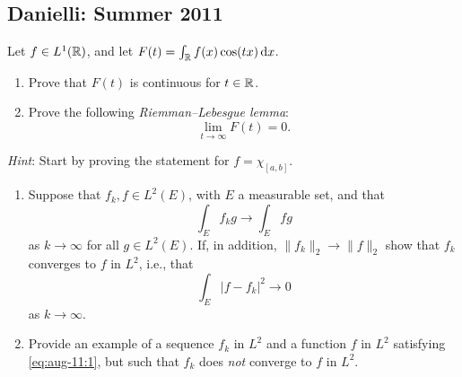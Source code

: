 \subsection{Danielli: Summer 2011}
\setcounter{exercise}{0}
\setcounter{equation}{0}

\begin{problem}
  Let \(f\in L^1(\mathbb{R})\), and let \(F(t)=\int_{\mathbb{R}} f(x)\cos(tx)\mathop{}\!\mathrm{d} x\).
\begin{enumerate}[label=(\alph*),noitemsep]
\item Prove that \(F(t)\) is continuous for \(t\in\mathbb{R}\).
\item Prove the following \emph{Riemman--Lebesgue lemma}:
\[
\lim_{t\to\infty}F(t)=0.
\]
\end{enumerate}
\emph{Hint}: Start by proving the statement for \(f=\chi_{[a,b]}\).
\end{problem}
\begin{solution}

\end{solution}

\begin{problem}
\begin{enumerate}[label=(\alph*),noitemsep]
\item Suppose that \(f_k,f\in L^2(E)\), with \(E\) a measurable set, and
  that
\begin{equation}
\label{eq:aug-11:1}
\int_E f_kg\longrightarrow\int_E fg
\end{equation}
as \(k\to\infty\) for all \(g\in L^2(E)\). If, in addition,
\(\|f_k\|_2\to\|f\|_2\) show that \(f_k\) converges to \(f\) in \(L^2\),
i.e., that
\[
\int_E|f-f_k|^2\longrightarrow 0
\]
as \(k\to\infty\).
\item Provide an example of a sequence \(f_k\) in \(L^2\) and a function
  \(f\) in \(L^2\) satisfying \eqref{eq:aug-11:1}, but such that \(f_k\)
  does \emph{not} converge to \(f\) in \(L^2\).
\end{enumerate}
\end{problem}
\begin{solution}
\end{solution}

